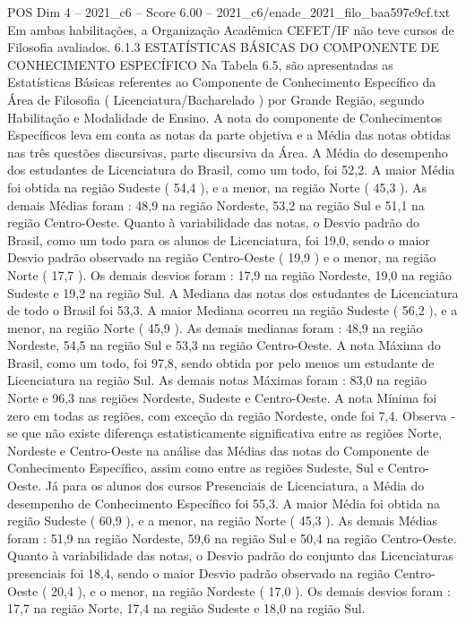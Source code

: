 \begin{textsample}{POS Dim 4 – 2021\_c6 – Score 6.00 – 2021\_c6/enade\_2021\_filo\_baa597e9cf.txt}
Em ambas habilitações, a Organização Acadêmica CEFET/IF não teve cursos de Filosofia avaliados. 6.1.3 ESTATÍSTICAS BÁSICAS DO COMPONENTE DE CONHECIMENTO ESPECÍFICO Na Tabela 6.5, são apresentadas as Estatísticas Básicas referentes ao Componente de Conhecimento Específico da Área de Filosofia ( Licenciatura/Bacharelado ) por Grande Região, segundo Habilitação e Modalidade de Ensino.
A nota do componente de Conhecimentos Específicos leva em conta as notas da parte objetiva e a Média das notas obtidas nas três questões discursivas, parte discursiva da Área.
A Média do desempenho dos estudantes de Licenciatura do Brasil, como um todo, foi 52,2.
A maior Média foi obtida na região Sudeste ( 54,4 ), e a menor, na região Norte ( 45,3 ).
As demais Médias foram : 48,9 na região Nordeste, 53,2 na região Sul e 51,1 na região Centro-Oeste.
Quanto à variabilidade das notas, o Desvio padrão do Brasil, como um todo para os alunos de Licenciatura, foi 19,0, sendo o maior Desvio padrão observado na região Centro-Oeste ( 19,9 ) e o menor, na região Norte ( 17,7 ).
Os demais desvios foram : 17,9 na região Nordeste, 19,0 na região Sudeste e 19,2 na região Sul.
A Mediana das notas dos estudantes de Licenciatura de todo o Brasil foi 53,3.
A maior Mediana ocorreu na região Sudeste ( 56,2 ), e a menor, na região Norte ( 45,9 ).
As demais medianas foram : 48,9 na região Nordeste, 54,5 na região Sul e 53,3 na região Centro-Oeste.
A nota Máxima do Brasil, como um todo, foi 97,8, sendo obtida por pelo menos um estudante de Licenciatura na região Sul.
As demais notas Máximas foram : 83,0 na região Norte e 96,3 nas regiões Nordeste, Sudeste e Centro-Oeste.
A nota Mínima foi zero em todas as regiões, com exceção da região Nordeste, onde foi 7,4.
Observa -se que não existe diferença estatisticamente significativa entre as regiões Norte, Nordeste e Centro-Oeste na análise das Médias das notas do Componente de Conhecimento Específico, assim como entre as regiões Sudeste, Sul e Centro-Oeste.
Já para os alunos dos cursos Presenciais de Licenciatura, a Média do desempenho de Conhecimento Específico foi 55,3.
A maior Média foi obtida na região Sudeste ( 60,9 ), e a menor, na região Norte ( 45,3 ).
As demais Médias foram : 51,9 na região Nordeste, 59,6 na região Sul e 50,4 na região Centro-Oeste.
Quanto à variabilidade das notas, o Desvio padrão do conjunto das Licenciaturas presenciais foi 18,4, sendo o maior Desvio padrão observado na região Centro-Oeste ( 20,4 ), e o menor, na região Nordeste ( 17,0 ).
Os demais desvios foram : 17,7 na região Norte, 17,4 na região Sudeste e 18,0 na região Sul.

\end{textsample}
